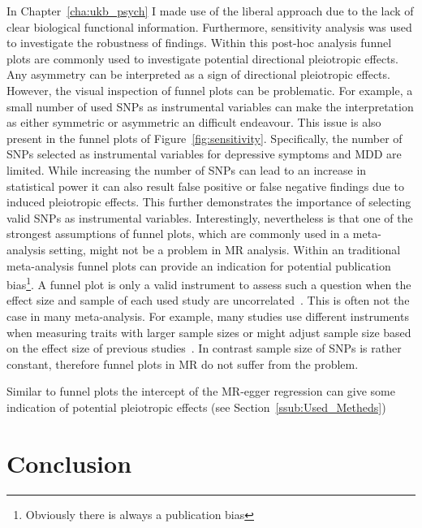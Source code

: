 In Chapter~\ref{cha:ukb_psych} I made use of the liberal approach due to the lack of clear biological functional information.
Furthermore, sensitivity analysis was used to investigate the robustness of findings.
Within this post-hoc analysis funnel plots are commonly used to investigate potential directional pleiotropic effects.
Any asymmetry can be interpreted as a sign of directional pleiotropic effects.
However, the visual inspection of funnel plots can be problematic.
For example, a small number of used SNPs as instrumental variables can make the interpretation as either symmetric or asymmetric an difficult endeavour. 
This issue is also present in the funnel plots of Figure~\ref{fig:sensitivity}.
Specifically, the number of SNPs selected as instrumental variables for depressive symptoms and MDD are limited. 
While increasing the number of SNPs can lead to an increase in statistical power it can also result false positive or false negative findings due to induced pleiotropic effects.
This further demonstrates the importance of selecting valid SNPs as instrumental variables.
Interestingly, nevertheless is that one of the strongest assumptions of funnel plots, which are commonly used in a meta-analysis setting, might not be a problem in MR analysis.
Within an traditional meta-analysis funnel plots can provide an indication for potential publication bias\footnote{Obviously there is always a publication bias}.
A funnel plot is only a valid instrument to assess such a question when the effect size and sample of each used study are uncorrelated~\cite{Evans2013}.
This is often not the case in many meta-analysis.
For example, many studies use different instruments when measuring traits with larger sample sizes or might adjust sample size based on the effect size of previous studies~\cite{Simonsohn}.
In contrast sample size of SNPs is rather constant, therefore funnel plots in MR do not suffer from the problem.

Similar to funnel plots the intercept of the MR-egger regression can give some indication of potential pleiotropic effects (see Section~\ref{ssub:Used_Metheds})

\section{Conclusion}
\label{sec:conclusion}


